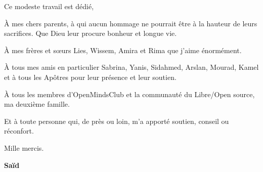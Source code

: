 

\vspace{1.5cm}


Ce modeste travail est dédié,

À mes chers parents, à qui aucun hommage ne pourrait être à la hauteur de leurs sacrifices. Que Dieu leur procure bonheur et longue vie.

À mes frères et sœurs Lies, Wissem, Amira et Rima que j'aime énormément.

À tous mes amis en particulier Sabrina, Yanis, Sidahmed, Arslan, Mourad, Kamel et à tous les Apôtres pour leur présence et leur soutien.

À tous les membres d'OpenMindsClub et la communauté du Libre/Open source, ma deuxième famille. 

Et à toute personne qui, de près ou loin, m'a apporté soutien, conseil ou réconfort. 

Mille mercis.\\

\vspace{0.5cm}
\begin{center}
\Large
\hspace{12.5cm}
\textbf{Saïd}
\end{center}
